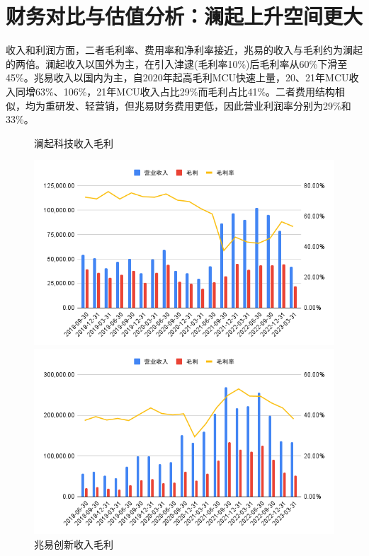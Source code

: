 \documentclass[a4paper,12pt]{ctexart}
\begin{document}
\section{财务对比与估值分析：澜起上升空间更大}
收入和利润方面，二者毛利率、费用率和净利率接近，兆易的收入与毛利约为澜起的两倍。澜起收入以国外为主，在引入津逮(毛利率10\%)后毛利率从60\%下滑至45\%。兆易收入以国内为主，自2020年起高毛利MCU快速上量，20、21年MCU收入同增63\%、106\%，21年MCU收入占比29\%而毛利占比41\%。二者费用结构相似，均为重研发、轻营销，但兆易财务费用更低，因此营业利润率分别为29\%和33\%。
\begin{figure}[H]
    \centering
    \begin{minipage}{0.48\linewidth}
        \caption{澜起科技收入毛利}
        \centering
        \includegraphics[width=\linewidth]{img/lq1.png}
    \end{minipage}
    \begin{minipage}{0.48\linewidth}
        \caption{兆易创新收入毛利}
        \centering
        \includegraphics[width=\linewidth]{img/zy1.png}

\end{minipage}
\end{figure}
\end{document}
